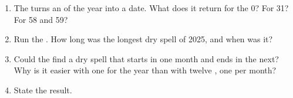 \begin{problem}
\begin{enumerate}[resume]
  \item The   turns an  of the year into a date. What
    does it return for the  0? For 31? For 58 and 59?
  \item Run the . How long was the longest dry spell of 2025, and when
    was it?
  \item Could the  find a dry spell that starts in one month and ends in
    the next? Why is it easier with one  for the year than with twelve
    , one per month?
  \item State the result.
\end{enumerate}
\end{problem}
